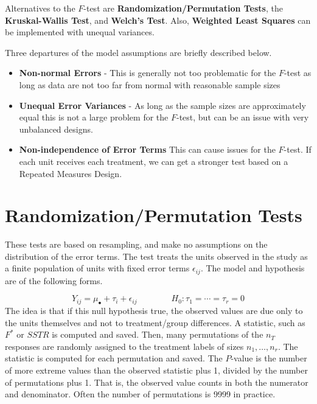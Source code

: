 \documentclass[
]{book}
\providecommand{\tightlist}{%
  \setlength{\itemsep}{0pt}\setlength{\parskip}{0pt}}
\begin{document}
Alternatives to the \(F\)-test are \textbf{Randomization/Permutation
Tests}, the \textbf{Kruskal-Wallis Test}, and \textbf{Welch's Test}.
Also, \textbf{Weighted Least Squares} can be implemented with unequal
variances.

Three departures of the model assumptions are briefly described below.

\begin{itemize}
\tightlist
\item
  \textbf{Non-normal Errors} - This is generally not too problematic for
  the \(F\)-test as long as data are not too far from normal with
  reasonable sample sizes
\item
  \textbf{Unequal Error Variances} - As long as the sample sizes are
  approximately equal this is not a large problem for the \(F\)-test,
  but can be an issue with very unbalanced designs.
\item
  \textbf{Non-independence of Error Terms} This can cause issues for the
  \(F\)-test. If each unit receives each treatment, we can get a
  stronger test based on a Repeated Measures Design.
\end{itemize}

\section{Randomization/Permutation
Tests}\label{randomizationpermutation-tests}

These tests are based on resampling, and make no assumptions on the
distribution of the error terms. The test treats the units observed in
the study as a finite population of units with fixed error terms
\(\epsilon_{ij}\). The model and hypothesis are of the following forms.

\[
Y_{ij}=\mu_{\bullet} + \tau_i + \epsilon_{ij} \qquad \qquad  H_0:\tau_1=\cdots = \tau_r=0 
\] The idea is that if this null hypothesis true, the observed values
are due only to the units themselves and not to treatment/group
differences. A statistic, such as \(F^*\) or \(SSTR\) is computed and
saved. Then, many permutations of the \(n_T\) responses are randomly
assigned to the treatment labels of sizes \(n_1,\ldots,n_r\). The
statistic is computed for each permutation and saved. The \(P\)-value is
the number of more extreme values than the observed statistic plus 1,
divided by the number of permutations plus 1. That is, the observed
value counts in both the numerator and denominator. Often the number of
permutations is 9999 in practice.
\end{document}
